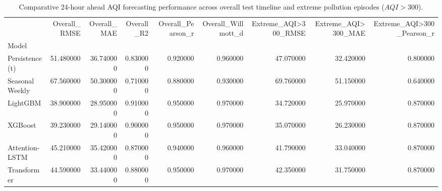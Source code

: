 \begin{table}
\caption{Comparative 24-hour ahead AQI forecasting performance across overall test timeline and extreme pollution episodes ($AQI > 300$).}
\label{tab:main_benchmark}
\begin{tabular}{lrrrrrrrr}
\toprule
 & Overall_RMSE & Overall_MAE & Overall_R2 & Overall_Pearson_r & Overall_Willmott_d & Extreme_AQI>300_RMSE & Extreme_AQI>300_MAE & Extreme_AQI>300_Pearson_r \\
Model &  &  &  &  &  &  &  &  \\
\midrule
Persistence (t) & 51.480000 & 36.740000 & 0.830000 & 0.920000 & 0.960000 & 47.070000 & 32.420000 & 0.800000 \\
Seasonal Weekly & 67.560000 & 50.300000 & 0.710000 & 0.880000 & 0.930000 & 69.760000 & 51.150000 & 0.640000 \\
LightGBM & 38.900000 & 28.950000 & 0.910000 & 0.950000 & 0.970000 & 34.720000 & 25.970000 & 0.870000 \\
XGBoost & 39.230000 & 29.140000 & 0.900000 & 0.950000 & 0.970000 & 35.070000 & 26.230000 & 0.870000 \\
Attention-LSTM & 45.210000 & 35.420000 & 0.870000 & 0.940000 & 0.960000 & 41.790000 & 33.040000 & 0.870000 \\
Transformer & 44.590000 & 33.440000 & 0.880000 & 0.950000 & 0.970000 & 42.350000 & 31.750000 & 0.870000 \\
\bottomrule
\end{tabular}
\end{table}
